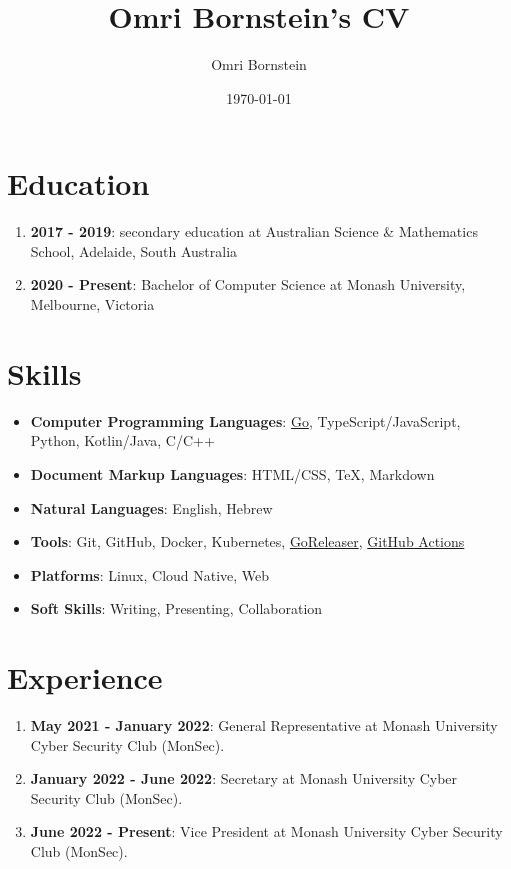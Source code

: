 \documentclass[a4paper]{article}
\title{Omri Bornstein's CV}
\author{Omri Bornstein}
\date{\today}
\begin{document}
	\section{Education}

	\begin{enumerate}
		\item \textbf{2017 - 2019}: secondary education at Australian Science \& Mathematics School, Adelaide, South Australia
		\item \textbf{2020 - Present}: Bachelor of Computer Science at Monash University, Melbourne, Victoria
	\end{enumerate}

	\section{Skills}

	\begin{itemize}
		\item \textbf{Computer Programming Languages}: \href{https://go.dev}{Go}, TypeScript/JavaScript, Python, Kotlin/Java, C/C++
		\item \textbf{Document Markup Languages}: HTML/CSS, \TeX, Markdown
		\item \textbf{Natural Languages}: English, Hebrew
		\item \textbf{Tools}: Git, GitHub, Docker, Kubernetes, \href{https://goreleaser.com}{GoReleaser}, \href{https://github.com/features/actions}{GitHub Actions}
		\item \textbf{Platforms}: Linux, Cloud Native, Web
		\item \textbf{Soft Skills}: Writing, Presenting, Collaboration
	\end{itemize}

	\section{Experience}

	\begin{enumerate}
		\item \textbf{May 2021 - January 2022}: General Representative at Monash University Cyber Security Club (MonSec).
		\item \textbf{January 2022 - June 2022}: Secretary at Monash University Cyber Security Club (MonSec).
		\item \textbf{June 2022 - Present}: Vice President at Monash University Cyber Security Club (MonSec).
	\end{enumerate}
\end{document}

